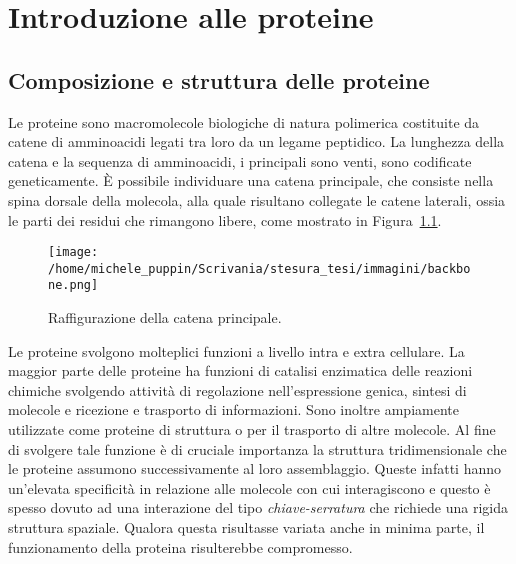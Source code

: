\chapter{Introduzione alle proteine}
\section{Composizione e struttura delle proteine}
Le proteine sono macromolecole biologiche di natura polimerica costituite da catene di amminoacidi legati tra loro da un legame peptidico. La lunghezza della catena e la sequenza di amminoacidi, i principali sono venti, sono codificate geneticamente. È possibile individuare una catena principale, che consiste nella spina dorsale della molecola, alla quale risultano collegate le catene laterali, ossia le parti dei residui che rimangono libere, come mostrato in Figura~\ref{fig:backbone}. \cite{protein_physics}
\begin{figure}[h]
\centering
\texttt{[image: /home/michele\_puppin/Scrivania/stesura\_tesi/immagini/backbone.png]}
\caption{Raffigurazione della catena principale. \cite{protein_physics}}
\label{fig:backbone}
\end{figure}

\noindent Le proteine svolgono molteplici funzioni a livello intra e extra cellulare. La maggior parte delle proteine ha funzioni di catalisi enzimatica delle reazioni chimiche svolgendo attività di regolazione nell'espressione genica, sintesi di molecole e ricezione e trasporto di informazioni. Sono inoltre ampiamente utilizzate come proteine di struttura o per il trasporto di altre molecole. 
Al fine di svolgere tale funzione è di cruciale importanza la struttura tridimensionale che le proteine assumono successivamente al loro assemblaggio. Queste infatti  hanno un'elevata specificità in relazione alle molecole con cui interagiscono e questo è spesso dovuto ad una interazione del tipo \textit{chiave-serratura} che richiede una rigida struttura spaziale. Qualora questa risultasse variata anche in minima parte, il funzionamento della proteina risulterebbe compromesso. \cite{protein_physics}

